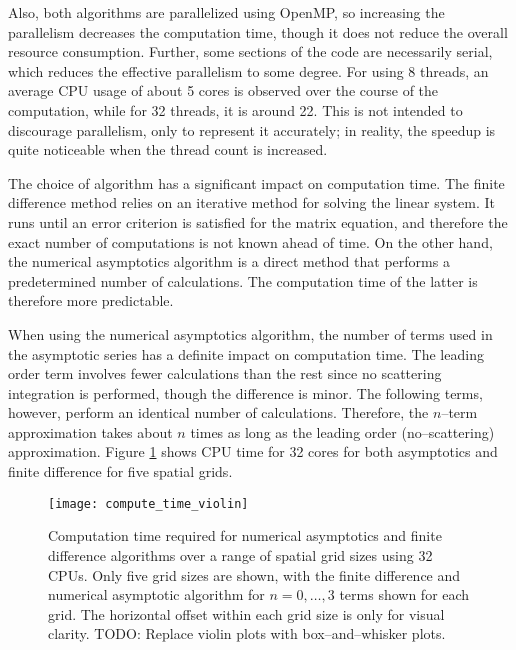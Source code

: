 Also, both algorithms are parallelized using OpenMP, so increasing the parallelism decreases the computation time, though it does not reduce the overall resource consumption. %
Further, some sections of the code are necessarily serial, which reduces the effective parallelism to some degree.
For using 8 threads, an average CPU usage of about 5 cores is observed over the course of the computation, while for 32 threads, it is around 22. %
This is not intended to discourage parallelism, only to represent it accurately; in reality, the speedup is quite noticeable when the thread count is increased.

The choice of algorithm has a significant impact on computation time.
The finite difference method relies on an iterative method for solving the linear system.
It runs until an error criterion is satisfied for the matrix equation, and therefore the exact number of computations is not known ahead of time.
On the other hand, the numerical asymptotics algorithm is a direct method that performs a predetermined number of calculations.
The computation time of the latter is therefore more predictable.

When using the numerical asymptotics algorithm, the number of terms used in the asymptotic series has a definite impact on computation time.
The leading order term involves fewer calculations than the rest since no scattering integration is performed, though the difference is minor.
The following terms, however, perform an identical number of calculations.
Therefore, the $n$--term approximation takes about $n$ times as long as the leading order (no--scattering) approximation.
Figure \ref{fig:compute_time_violin} shows CPU time for 32 cores for both asymptotics and finite difference for five spatial grids.

\begin{figure}[h]
  \centering
  \texttt{[image: compute\_time\_violin]}
  \caption{Computation time required for numerical asymptotics and finite difference algorithms over a range of spatial grid sizes using 32 CPUs. Only five grid sizes are shown, with the finite difference and numerical asymptotic algorithm for $n=0,\ldots,3$ terms shown for each grid. The horizontal offset within each grid size is only for visual clarity. TODO: Replace violin plots with box--and--whisker plots.}
  \label{fig:compute_time_violin}
\end{figure}

